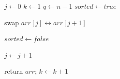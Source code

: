 \documentclass{article}
\begin{document}

\begin{algorithm}
$j \gets 0$\;
$k \gets 1$\;
$q \gets n-1$\;
$sorted \gets true$\;
{
    {
        {
            swap $arr[j] \leftrightarrow arr[j+1]$
            
            $sorted \gets false$\;
        }

        $j \gets j + 1$\;
    }
    {
        return $arr$;
    }
    $k \gets k + 1$\;
}
\end{algorithm}
\end{document}
